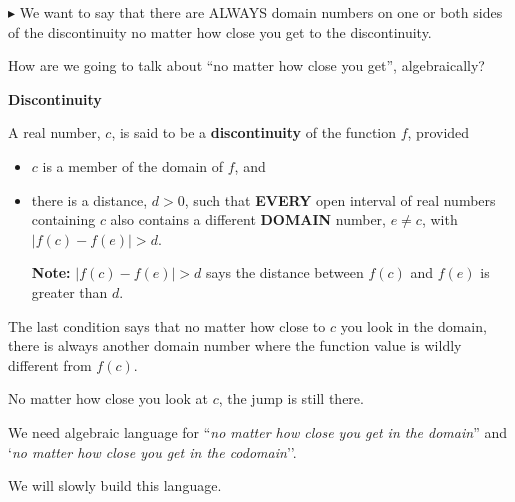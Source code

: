 \documentclass{ximera}
\begin{document}
$\blacktriangleright$ We want to say that there are ALWAYS domain numbers on one or both sides of the discontinuity no matter how close you get to the discontinuity. 

How are we going to talk about ``no matter how close you get'', algebraically?







\begin{definition} \textbf{\textcolor{green!50!black}{Discontinuity}}  

A real number, $c$, is said to be a \textbf{discontinuity} of the function $f$, provided

\begin{itemize}
\item $c$ is a member of the domain of $f$, and


\item there is a distance, $d > 0$, such that \textbf{\textcolor{purple!85!blue}{EVERY}} open interval of real numbers containing $c$ also contains a different \textbf{\textcolor{purple!85!blue}{DOMAIN}} number, $e \ne c$, with $ |f(c) - f(e)| > d $.


\textbf{Note:}  $ |f(c) - f(e)| > d $ says the distance between $f(c)$ and $f(e)$ is greater than $d$.


\end{itemize}



\end{definition}




The last condition says that no matter how close to $c$ you look in the domain, there is always another domain number where the function value is wildly different from $f(c)$.

No matter how close you look at $c$, the jump is still there.


We need algebraic language for ``\textit{no matter how close you get in the domain}'' and `\textit{no matter how close you get in the codomain}''.


We will slowly build this language.
\end{document}
